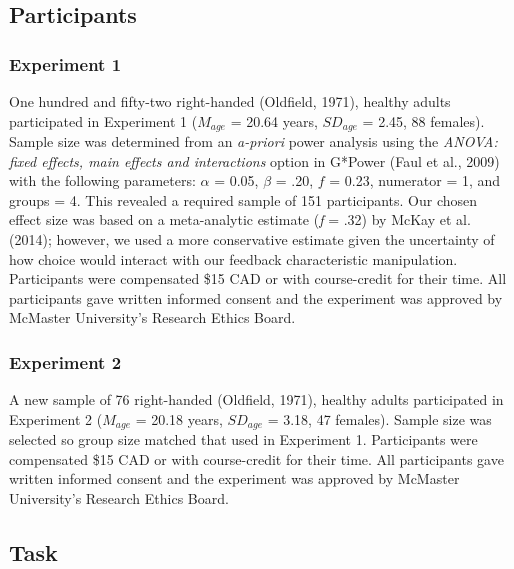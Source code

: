 \documentclass[
  doc, donotrepeattitle,floatsintext]{apa7}
\begin{document}
\hypertarget{participants}{%
\subsection{Participants}\label{participants}}

\hypertarget{experiment-1}{%
\subsubsection{Experiment 1}\label{experiment-1}}

One hundred and fifty-two right-handed (Oldfield, 1971), healthy adults participated in Experiment 1 (\(M_{age}\) = 20.64 years, \(SD_{age}\) = 2.45, 88 females). Sample size was determined from an \emph{a-priori} power analysis using the \emph{ANOVA: fixed effects, main effects and interactions} option in G*Power (Faul et al., 2009) with the following parameters: \(\alpha\) = 0.05, \(\beta\) = .20, \(f\) = 0.23, numerator = 1, and groups = 4. This revealed a required sample of 151 participants. Our chosen effect size was based on a meta-analytic estimate (\emph{f} = .32) by McKay et al. (2014); however, we used a more conservative estimate given the uncertainty of how choice would interact with our feedback characteristic manipulation. Participants were compensated \$15 CAD or with course-credit for their time. All participants gave written informed consent and the experiment was approved by McMaster University's Research Ethics Board.

\hypertarget{experiment-2}{%
\subsubsection{Experiment 2}\label{experiment-2}}

A new sample of 76 right-handed (Oldfield, 1971), healthy adults participated in Experiment 2 (\(M_{age}\) = 20.18 years, \(SD_{age}\) = 3.18, 47 females). Sample size was selected so group size matched that used in Experiment 1. Participants were compensated \$15 CAD or with course-credit for their time. All participants gave written informed consent and the experiment was approved by McMaster University's Research Ethics Board.

\hypertarget{task}{%
\subsection{Task}\label{task}}
\end{document}
